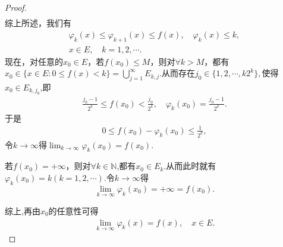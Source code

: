 \documentclass[../../main.tex]{subfiles}
\begin{document}
\begin{proof}
\begin{align*}
\end{align*}
综上所述，我们有 
\begin{gather*}
\varphi_k(x) \leqslant \varphi_{k + 1}(x) \leqslant f(x), \quad \varphi_k(x) \leqslant k, \\
x \in E, \quad k = 1, 2, \cdots.
\end{gather*}
现在，对任意的$x_0 \in E$，\one 若$f(x_0) \leqslant M$，则对$\forall k > M$，都有$x_0\in \{x\in E:0\leqslant f(x)<k\}=\bigcup_{j=1}^{\infty}E_{k,j}$.从而存在$j_0\in \{1,2,\cdots,k2^k\},$使得$x_0\in E_{k,j_0}$,即
\begin{align*}
\frac{j_0-1}{2^k}\leqslant f(x_0)<\frac{j_0}{2^k},\quad \varphi_k(x_0)=\frac{j_0-1}{2^k}.
\end{align*}
于是
\begin{align*}
0 \leqslant f(x_0) - \varphi_k(x_0) \leqslant \frac{1}{2^k},
\end{align*}
令$k\to \infty$得$\lim_{k \to \infty} \varphi_k(x_0) = f(x_0).$

\two 若$f(x_0) = +\infty$，则对$\forall k\in \mathbb{N}$,都有$x_0\in E_k$.从而此时就有$\varphi_k(x_0) = k (k = 1, 2, \cdots).$令$k\to \infty$得$$\lim_{k \to \infty} \varphi_k(x_0) =+\infty = f(x_0).$$

综上,再由$x_0$的任意性可得
\begin{align*}
\lim_{k \to \infty} \varphi_k(x) = f(x), \quad x \in E.
\end{align*}


\end{proof}
\end{document}
